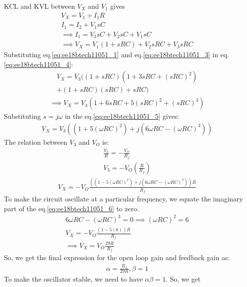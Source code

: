 \begin{enumerate}[label=\arabic*.,ref=\theenumi]
KCL and KVL between $V_{X}$ and $V_{1}$ gives 
\begin{align}
    V_{X} = V_{1} + I_{1}R\\
    I_{1} = I_{2} + V_{1}sC\\
    \implies I_{1} = V_{3}sC + V_{2}sC + V_{1}sC\\
    \implies V_{X} = V_{1}(1+sRC) + V_{2}sRC + V_{3}sRC
    \label{eq:ee18btech11051_4}
\end{align}
Substituting eq.\ref{eq:ee18btech11051_1} and eq.\ref{eq:ee18btech11051_3} in eq.\ref{eq:ee18btech11051_4}:
\begin{multline}
    V_{X} = V_{3}((1+sRC)(1+ 3sRC+ (sRC)^{2})\\+(1+sRC)(sRC)+sRC)
\end{multline}
\begin{align}
    \implies V_{X} = V_{3}(1+ 6sRC+ 5(sRC)^{2}+ (sRC)^{3}) \label{eq:ee18btech11051_5}
\end{align}
Substituting $ s = j\omega$ in the eq.\ref{eq:ee18btech11051_5} gives:
\begin{align}
    V_{X} = V_{3}((1+5(\omega RC)^{2}) + j(6\omega RC - (\omega RC)^{3})) \label{eq:ee18btech11051_6}
\end{align}
The relation between $V_{3}$ and $V_{O}$ is:
\begin{align}
    \frac{V_{3}}{R} = -\frac{V_{O}}{R_{f}}\\
     V_{3} = -V_{O}(\frac{R}{R_{f}})
\end{align}
\begin{align}
     V_{X} = -V_{O}\frac{((1-5(\omega RC)^{2}) + j(6\omega RC - (\omega RC)^{3}))R}{R_{f}}
\end{align}
To make the circuit oscillate at a particular frequency, we equate the imaginary part of the eq.\ref{eq:ee18btech11051_6} to zero.
\begin{align}
    6\omega RC -(\omega RC)^{3}=0 \implies (\omega RC)^{2} = 6 \label{eq:ee18btech11051_7}\\
    V_{X} = -V_{O}\frac{(1 - 5(6))R}{R_{f}}\\
    \implies V_{X} = V_{O}\frac{29R}{R_{f}}
\end{align}
So, we get the final expression for the open loop gain and feedback gain as:
\begin{align}
    \alpha = \frac{R_{f}}{29R}  ,   \beta = 1
\end{align}
To make the oscillator stable, we need to have $\alpha \beta = 1$. So, we get
\begin{align}

\end{align}
\end{enumerate}
